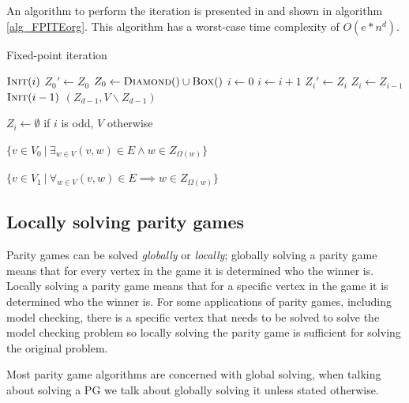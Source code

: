 An algorithm to perform the iteration is presented in \cite{FPITE} and shown in algorithm \ref{alg_FPITEorg}. This algorithm has a worst-case time complexity of $O(e * n ^d)$.
\begin{algorithm}
	\caption{Fixed-point iteration}
	\label{alg_FPITEorg}
	\begin{multicols}{2}
		\begin{algorithmic}[1]
			\State $\textsc{Init}(i)$
			\EndFor
			\Repeat
			\State $Z_0'\gets Z_0$
			\State $Z_0 \gets \textsc{Diamond}() \cup \textsc{Box}()$
			\State $i \gets 0$
			\State $i \gets i+1$
			\State $Z_i' \gets Z_i$
			\State $Z_i \gets Z_{i-1}$
			\State $\textsc{Init}(i-1)$
			\EndWhile
			\State \Return $(Z_{d-1},V\backslash Z_{d-1})$
			\EndFunction
		\end{algorithmic}\bigskip\bigskip
		\begin{algorithmic}[1]
			\Function{Init}{$i$}
			\State $Z_i \gets \emptyset$ if $i$ is odd, $V$ otherwise
			\EndFunction
		\end{algorithmic}\bigskip
		\begin{algorithmic}[1]
			\Function{Diamond}{}
			\State \Return $\{ v \in V_0\ |\ \exists_{w\in V} (v,w) \in E \wedge w \in Z_{\Omega(w)}\}$
			\EndFunction
		\end{algorithmic}\bigskip
		\begin{algorithmic}[1]
			\Function{Box}{}
			\State \Return $\{ v \in V_1\ |\ \forall_{w\in V} (v,w) \in E \implies w \in Z_{\Omega(w)}\}$
			\EndFunction
		\end{algorithmic}
	\end{multicols}
\end{algorithm}

\subsection{Locally solving parity games}
Parity games can be solved \textit{globally} or \textit{locally}; globally solving a parity game means that for every vertex in the game it is determined who the winner is. Locally solving a parity game means that for a specific vertex in the game it is determined who the winner is. For some applications of parity games, including model checking, there is a specific vertex that needs to be solved to solve the model checking problem so locally solving the parity game is sufficient for solving the original problem.

Most parity game algorithms are concerned with global solving, when talking about solving a PG we talk about globally solving it unless stated otherwise. 